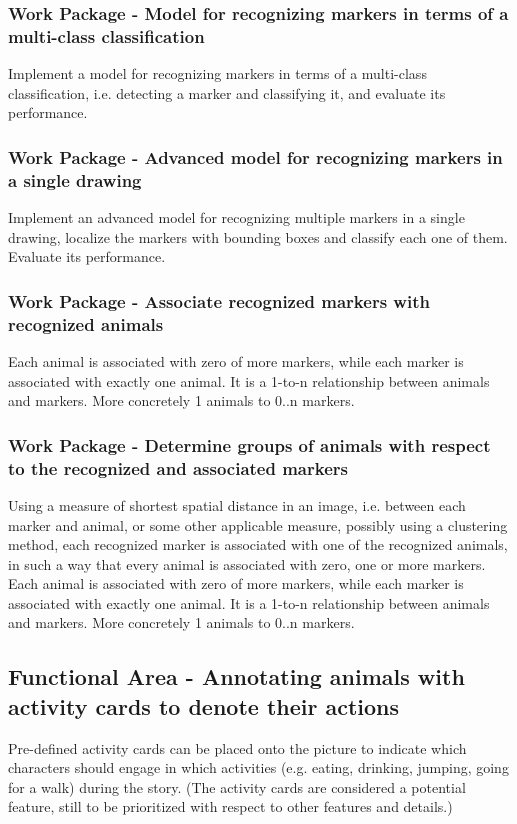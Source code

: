 \subsubsection{Work Package - Model for recognizing markers in terms of a multi-class classification}
Implement a model for recognizing markers in terms of a multi-class classification, i.e. detecting a marker and classifying it, and evaluate its performance.

\subsubsection{Work Package - Advanced model for recognizing markers in a single drawing}
Implement an advanced model for recognizing multiple markers in a single drawing, localize the markers with bounding boxes and classify each one of them.
Evaluate its performance.

\subsubsection{Work Package - Associate recognized markers with recognized animals}
Each animal is associated with zero of more markers, while each marker is associated with exactly one animal.
It is a 1-to-n relationship between animals and markers.
More concretely 1 animals to 0..n markers.

\subsubsection{Work Package - Determine groups of animals with respect to the recognized and associated markers}
Using a measure of shortest spatial distance in an image, i.e. between each marker and animal, or some other applicable measure, possibly using a clustering method, each recognized marker is associated with one of the recognized animals, in such a way that every animal is associated with zero, one or more markers.
Each animal is associated with zero of more markers, while each marker is associated with exactly one animal.
It is a 1-to-n relationship between animals and markers.
More concretely 1 animals to 0..n markers.



\subsection{Functional Area - Annotating animals with activity cards to denote their actions}
Pre-defined activity cards can be placed onto the picture to indicate which characters should engage in which activities (e.g. eating, drinking, jumping, going for a walk) during the story. (The activity cards are considered a potential feature, still to be prioritized with respect to other features and details.)

